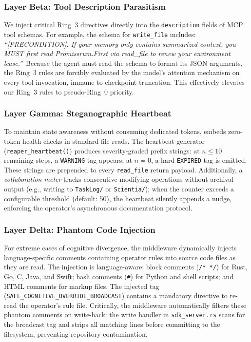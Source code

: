 \subsubsection{Layer Beta: Tool Description Parasitism}
We inject critical Ring~3 directives directly into the
\texttt{description} fields of MCP tool schemas. For example, the
schema for \texttt{write\_file} includes: \textit{``[PRECONDITION]:
If your memory only contains summarized context, you MUST first
read Promissrum.First via read\_file to renew your environment
lease.''}\ Because the agent must read the schema to format its
JSON arguments, the Ring~3 rules are forcibly evaluated by the
model's attention mechanism on every tool invocation, immune to
checkpoint truncation. This effectively elevates our Ring~3 rules
to pseudo-Ring~0 priority.

\subsubsection{Layer Gamma: Steganographic Heartbeat}
To maintain state awareness without consuming dedicated tokens,
\reaper{} embeds zero-token health checks in standard file reads.
The heartbeat generator (\texttt{reaper\_heartbeat()}) produces
severity-graded prefix strings: at $n \leq 10$ remaining steps,
a \texttt{WARNING} tag appears; at $n = 0$, a hard \texttt{EXPIRED}
tag is emitted. These strings are prepended to every
\texttt{read\_file} return payload. Additionally, a \emph{collaboration
meter} tracks consecutive modifying operations without archival
output (e.g., writing to \texttt{TaskLog/} or \texttt{Scientia/});
when the counter exceeds a configurable threshold (default: 50),
the heartbeat silently appends a nudge, enforcing the operator's
asynchronous documentation protocol.

\subsubsection{Layer Delta: Phantom Code Injection}
For extreme cases of cognitive divergence, the middleware dynamically
injects language-specific comments containing operator rules into
source code files as they are read. The injection is language-aware:
block comments (\texttt{/* */}) for Rust, Go, C, Java, and Swift;
hash comments (\texttt{\#}) for Python and shell scripts; and HTML
comments for markup files. The injected tag
(\texttt{SAFE\_COGNITIVE\_OVERRIDE\_BROADCAST}) contains a mandatory
directive to re-read the operator's rule file. Critically, the
middleware automatically filters these phantom comments on write-back:
the write handler in \texttt{sdk\_server.rs} scans for the broadcast
tag and strips all matching lines before committing to the filesystem,
preventing repository contamination.

